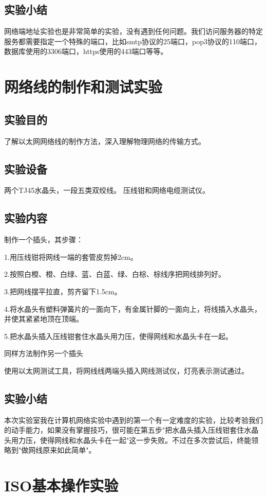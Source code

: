 \documentclass[lang=cn,11pt,a4paper,cite=authoryear]{elegantpaper}
\begin{document}
\subsection{实验小结}

网络端地址实验也是非常简单的实验，没有遇到任何问题。我们访问服务器的特定服务都需要指定一个特殊的端口，比如smtp协议的25端口，pop3协议的110端口，数据库使用的3306端口，https使用的443端口等等。
\section{网络线的制作和测试实验}
\subsection{实验目的}
了解以太网网络线的制作方法，深入理解物理网络的传输方式。
\subsection{实验设备}
两个TJ45水晶头，一段五类双绞线。
压线钳和网络电缆测试仪。

\subsection{实验内容}
制作一个插头，其步骤：

	1.用压线钳将网线一端的套管皮剪掉2cm。

	2.按照白橙、橙、白绿、蓝、白蓝、绿、白棕、棕线序把网线排列好。

	3.把网线摆平拉直，剪齐留下1.5cm。

	4.将水晶头有塑料弹簧片的一面向下，有金属针脚的一面向上，将线插入水晶头，并使其紧紧地顶在顶端。

	5.把水晶头插入压线钳套住水晶头用力压，使得网线和水晶头卡在一起。 

同样方法制作另一个插头

使用以太网测试工具，将网线线两端头插入网线测试仪，灯亮表示测试通过。 
\subsection{实验小结}

本次实验室我在计算机网络实验中遇到的第一个有一定难度的实验，比较考验我们的动手能力，如果没有掌握技巧，很可能在第五步"把水晶头插入压线钳套住水晶头用力压，使得网线和水晶头卡在一起"这一步失败。不过在多次尝试后，终能领略到"做网线原来如此简单"。
\section{ISO基本操作实验}
\end{document}
